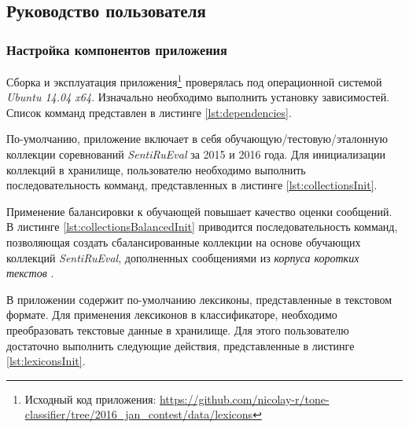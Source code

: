 \subsection{Руководство пользователя}
    \subsubsection{Настройка компонентов приложения}
    Сборка и эксплуатация приложения\footnote{Исходный код приложения:
            \url{https://github.com/nicolay-r/tone-classifier/tree/2016_jan_contest/data/lexicons}
    }
    проверялась под операционной системой
    {\it Ubuntu 14.04 x64}.
    Изначально необходимо выполнить установку зависимостей.
    Список комманд представлен в листинге \ref{lst:dependencies}.
    \lstset{style=bash}
    

        По-умолчанию, приложение включает в себя обучающую/тестовую/эталонную
        коллекции соревнований {\it SentiRuEval} за 2015 и 2016 года. Для
        инициализации коллекций в хранилище, пользователю необходимо выполнить
        последовательность комманд, представленных в листинге \ref{lst:collectionsInit}.
        \lstset{style=bash}
        

        Применение балансировки к обучающей повышает качество оценки сообщений.
        \cite{diploma2015} В листинге \ref{lst:collectionsBalancedInit} приводится
        последовательность комманд, позволяющая создать сбалансированные коллекции
        на основе обучающих коллекций {\it SentiRuEval}, дополненных сообщениями
        из {\it корпуса коротких текстов} \cite{rubtsovaCollection}.
        \lstset{style=bash}
        

        В приложении содержит по-умолчанию лексиконы, представленные в текстовом
        формате. Для применения лексиконов в классификаторе, необходимо преобразовать
        текстовые данные в хранилище. Для этого пользователю
        достаточно выполнить следующие действия, представленные в листинге
        \ref{lst:lexiconsInit}.
        \lstset{style=bash}
        

